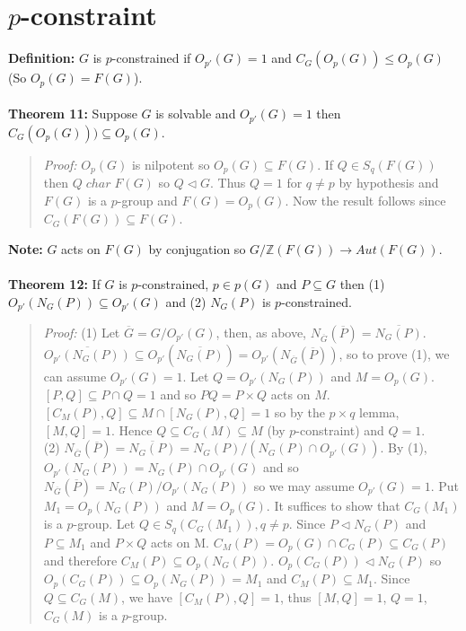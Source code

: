 \section {$p$-constraint}
{\bf Definition:} $G$ is $p$-constrained if $O_{p'}(G)=1$ and $C_G(O_p(G)) \leq O_p(G)$ (So
$O_p(G)=F(G)$).
\\
\\
{\bf Theorem 11:}
Suppose $G$ is solvable and $O_{p'}(G)=1$ then $C_G(O_p(G))) \subseteq O_p(G)$.
\begin{quote}
\emph{Proof:}
$O_p(G)$ is nilpotent so $O_p(G) \subseteq F(G)$.  If $Q \in S_q(F(G))$ then
$Q \; char \; F(G)$ so $Q \lhd G$.  Thus $Q=1$ for $q \ne p$ by hypothesis and
$F(G)$ is a $p$-group and $F(G)=O_p(G)$.  Now the result follows since $C_G(F(G)) \subseteq F(G)$.
\end{quote}
{\bf Note:} $G$ acts on $F(G)$ by conjugation so $G/{\mathbb Z}(F(G)) \rightarrow Aut(F(G))$.
\\
\\
{\bf Theorem 12:}  If $G$ is $p$-constrained, $p \in p(G)$ and $P \subseteq G$ then
(1) $O_{p'}(N_G(P)) \subseteq O_{p'}(G)$ and 
(2) $N_G(P)$ is $p$-constrained.
\begin{quote}
\emph{Proof:}  
(1) Let ${\overline G}= G/O_{p'}(G)$, then, as above,
$N_{{\overline G}}({\overline P}) = {\overline {N_G(P)}}$.
${\overline {O_{p'}(N_G(P))}} \subseteq O_{p'}({\overline {N_G(P)}}) = 
O_{p'}(N_{\overline G}({\overline P}))$, so to prove (1), we can assume $O_{p'}(G) = 1$.
Let $Q= O_{p'}(N_G(P))$ and $M= O_p(G)$.  $[P, Q] \subseteq P \cap Q = 1$ and so
$PQ= P \times Q$ acts on $M$.  $[C_M(P),Q] \subseteq M \cap [N_G(P), Q] = 1$ so
by the $p \times q$ lemma, $[M, Q] = 1$.   Hence
$Q \subseteq C_G(M) \subseteq M$ (by $p$-constraint) and $Q = 1$.
\\
(2)
$N_{{\overline G}}({\overline P}) = {\overline {N_G(P)}}= N_G(P)/(N_G(P) \cap O_{p'}(G))$.
By (1), $O_{p'}(N_G(P)) = N_G(P) \cap O_{p'}(G)$ and so
$N_{\overline G}({\overline P})= N_G(P)/O_{p'}(N_G(P))$ so we
may assume $O_{p'}(G) = 1$.
Put $M_1 = O_p(N_G(P))$ and $M=O_p(G)$.  It suffices to show that $C_G(M_1 )$ is a $p$-group.
Let $Q \in S_q(C_G(M_1 )), q \ne p$.  Since $P \lhd N_G(P)$ and $P \subseteq M_1$ and
$P \times Q$ acts on M.  $C_M(P)= O_p(G) \cap C_G(P) \subseteq C_G(P)$ and therefore
$C_M(P) \subseteq O_p (N_G(P))$.  $O_p (C_G(P)) \lhd N_G(P)$ so
$O_p(C_G(P)) \subseteq O_p(N_G(P))= M_1$ and $C_M(P) \subseteq M_1$.  Since
$Q \subseteq C_G(M)$, we have $[C_M(P), Q] = 1$, thus $[M, Q]= 1 $, $Q = 1$, $C_G(M)$ is
a $p$-group.
\end{quote}
